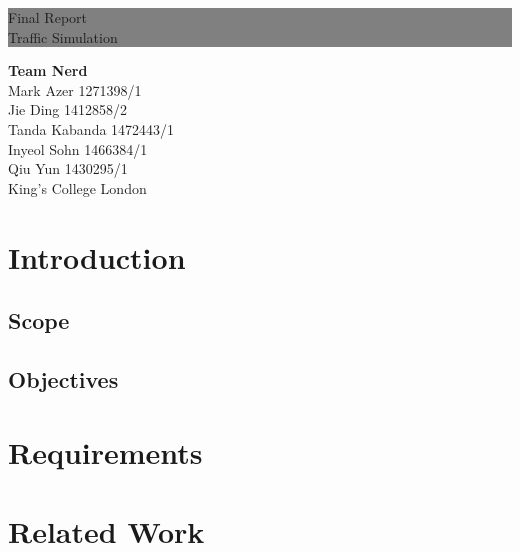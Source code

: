 \documentclass[11pt]{article}
\begin{document}
	\thispagestyle{empty} %

	\colorbox{grey}{
		\parbox[t]{1.0\linewidth}{
			\centering \fontsize{180pt}{40pt}\selectfont %
			\vspace*{0.3cm} %
			
			\hfill Final Report \\
			\hfill Traffic Simulation\par
			
			\vspace*{0.7cm} %
		}
	}
	\vfill %
	{\centering \large 
		\hfill \textbf{Team Nerd} \\
		\hfill Mark Azer 1271398/1\\
		\hfill Jie Ding 1412858/2 \\
		\hfill Tanda Kabanda 1472443/1 \\
		\hfill Inyeol Sohn 1466384/1 \\
		\hfill Qiu Yun 1430295/1 \\
		\hfill King's College London \\
	}
	\clearpage %
	\tableofcontents
	
	\section{Introduction} %
	\subsection{Scope}
	\subsection{Objectives} %
	\section{Requirements} %
	\section{Related Work} %
\end{document}
